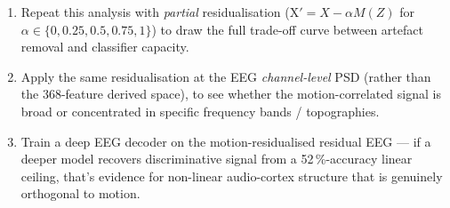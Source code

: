 \begin{enumerate}
  \item Repeat this analysis with \emph{partial} residualisation
        ($\text{X}' = X - \alpha M(Z)$ for $\alpha \in \{0, 0.25,
        0.5, 0.75, 1\}$) to draw the full trade-off curve between
        artefact removal and classifier capacity.
  \item Apply the same residualisation at the EEG \emph{channel-level}
        PSD (rather than the 368-feature derived space), to see
        whether the motion-correlated signal is broad or concentrated
        in specific frequency bands / topographies.
  \item Train a deep EEG decoder on the motion-residualised residual
        EEG --- if a deeper model recovers discriminative signal from
        a 52\,\%-accuracy linear ceiling, that's evidence for
        non-linear audio-cortex structure that is genuinely orthogonal
        to motion.
\end{enumerate}
